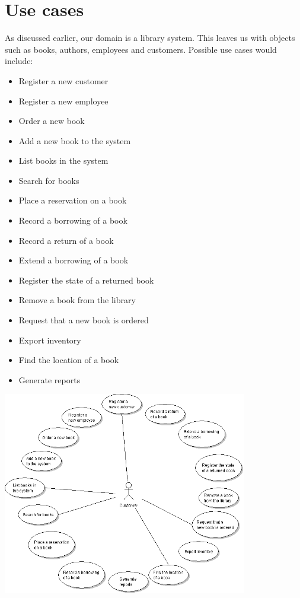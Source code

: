 \section{Use cases}
As discussed earlier, our domain is a library system. This leaves us with objects such as books, authors, employees and customers. Possible use cases would include: 
\begin{itemize}
  \item Register a new customer
  \item Register a new employee
  \item Order a new book
  \item Add a new book to the system
  \item List books in the system
  \item Search for books
  \item Place a reservation on a book
  \item Record a borrowing of a book
  \item Record a return of a book
  \item Extend a borrowing of a book
  \item Register the state of a returned book
  \item Remove a book from the library
  \item Request that a new book is ordered
  \item Export inventory
  \item Find the location of a book
  \item Generate reports
\end{itemize}

\begin{center}
\includegraphics[width = 0.8\textwidth]{image/usecase-customer.png}
\label{usecase-customer}%
\end{center}

